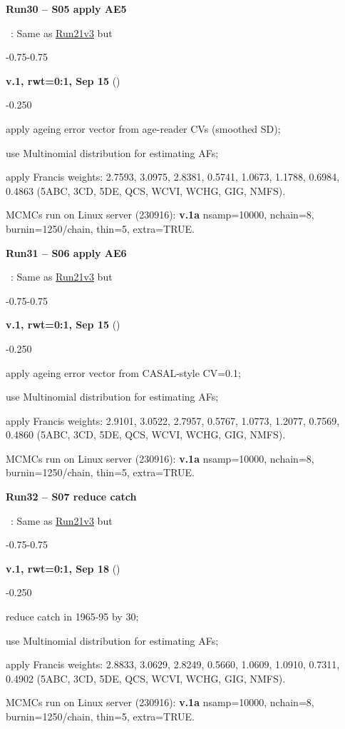 \hypertarget{R30}{\textbf{Run30 -- S05 apply AE5}}~: Same as \hyperlink{R21}{Run21v3} but
\begin{itemize_csas}{-0.75}{-0.75}
	\item \textbf{v.1, rwt=0:1, Sep 15} ()
	\begin{itemize_csas}{-0.25}{0}
		\item apply ageing error vector from age-reader CVs (smoothed SD);
		\item use Multinomial distribution for estimating AFs;
		\item apply Francis weights: 2.7593, 3.0975, 2.8381, 0.5741, 1.0673, 1.1788, 0.6984, 0.4863 (5ABC, 3CD, 5DE, QCS, WCVI, WCHG, GIG, NMFS).
		\item MCMCs run on Linux server (230916): \textbf{v.1a} nsamp=10000, nchain=8, burnin=1250/chain, thin=5, extra=TRUE.
	\end{itemize_csas}
\end{itemize_csas}

\hypertarget{R31}{\textbf{Run31 -- S06 apply AE6}}~: Same as \hyperlink{R21}{Run21v3} but
\begin{itemize_csas}{-0.75}{-0.75}
	\item \textbf{v.1, rwt=0:1, Sep 15} ()
	\begin{itemize_csas}{-0.25}{0}
		\item apply ageing error vector from CASAL-style CV=0.1;
		\item use Multinomial distribution for estimating AFs;
		\item apply Francis weights: 2.9101, 3.0522, 2.7957, 0.5767, 1.0773, 1.2077, 0.7569, 0.4860 (5ABC, 3CD, 5DE, QCS, WCVI, WCHG, GIG, NMFS).
		\item MCMCs run on Linux server (230916): \textbf{v.1a} nsamp=10000, nchain=8, burnin=1250/chain, thin=5, extra=TRUE.
	\end{itemize_csas}
\end{itemize_csas}

\hypertarget{R32}{\textbf{Run32 -- S07 reduce catch}}~: Same as \hyperlink{R21}{Run21v3} but
\begin{itemize_csas}{-0.75}{-0.75}
	\item \textbf{v.1, rwt=0:1, Sep 18} ()
	\begin{itemize_csas}{-0.25}{0}
		\item reduce catch in 1965-95 by 30\pc{};
		\item use Multinomial distribution for estimating AFs;
		\item apply Francis weights: 2.8833, 3.0629, 2.8249, 0.5660, 1.0609, 1.0910, 0.7311, 0.4902 (5ABC, 3CD, 5DE, QCS, WCVI, WCHG, GIG, NMFS).
		\item MCMCs run on Linux server (230916): \textbf{v.1a} nsamp=10000, nchain=8, burnin=1250/chain, thin=5, extra=TRUE.
	\end{itemize_csas}
\end{itemize_csas}

